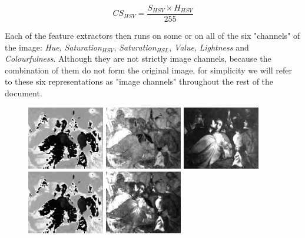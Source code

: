 \documentclass[11pt,a4paper,twoside,openright]{report}
\begin{document}
\begin{equation}
CS_{HSV} = \frac{S_{HSV} \times H_{HSV}}{255}
\label{eq:cs}
\end{equation}

Each of the feature extractors then runs on some or on all of the six
"channels" of the image: \emph{Hue}, \emph{Saturation$_{HSV}$},
\emph{Saturation$_{HSL}$}, \emph{Value}, \emph{Lightness} and
\emph{Colourfulness}.  Although they are not strictly image channels, because
the combination of them do not form the original image, for simplicity we will
refer to these six representations as "image channels" throughout the rest of
the document.

\begin{figure}[tbp]
\centering
\includegraphics[width=0.30\textwidth]{H_caravaggio_1962_139_1}
\includegraphics[width=0.30\textwidth]{SHSV_caravaggio_1962_139_1}
\includegraphics[width=0.30\textwidth]{V_caravaggio_1962_139_1}
\includegraphics[width=0.30\textwidth]{H_caravaggio_1962_139_1}
\includegraphics[width=0.30\textwidth]{SHSL_caravaggio_1962_139_1}

\end{figure}
\end{document}

